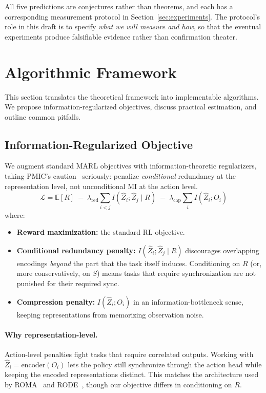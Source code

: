 \documentclass[10pt, letterpaper]{article}
\begin{document}
All five predictions are conjectures rather than theorems, and each has a corresponding measurement protocol in Section~\ref{sec:experiments}. The protocol's role in this draft is to specify \emph{what we will measure and how}, so that the eventual experiments produce falsifiable evidence rather than confirmation theater.

\section{Algorithmic Framework}
\label{sec:algorithm}

This section translates the theoretical framework into implementable algorithms. We propose information-regularized objectives, discuss practical estimation, and outline common pitfalls.

\subsection{Information-Regularized Objective}

We augment standard MARL objectives with information-theoretic regularizers, taking PMIC's caution~\cite{li2022pmic} seriously: penalize \emph{conditional} redundancy at the representation level, not unconditional MI at the action level.
\[\mathcal{L} = \mathbb{E}[R] \;-\; \lambda_{\text{red}} \sum_{i < j} I\!\left(\hat{Z}_i; \hat{Z}_j \mid R\right) \;-\; \lambda_{\text{cap}} \sum_i I\!\left(\hat{Z}_i; O_i\right)\]
where:
\begin{itemize}
    \item \textbf{Reward maximization:} the standard RL objective.
    \item \textbf{Conditional redundancy penalty:} $I(\hat{Z}_i; \hat{Z}_j \mid R)$ discourages overlapping encodings \emph{beyond} the part that the task itself induces. Conditioning on $R$ (or, more conservatively, on $S$) means tasks that require synchronization are not punished for their required sync.
    \item \textbf{Compression penalty:} $I(\hat{Z}_i; O_i)$ in an information-bottleneck sense, keeping representations from memorizing observation noise.
\end{itemize}

\paragraph{Why representation-level.} Action-level penalties fight tasks that require correlated outputs. Working with $\hat{Z}_i = \mathrm{encoder}(O_i)$ lets the policy still synchronize through the action head while keeping the encoded representations distinct. This matches the architecture used by ROMA~\cite{wang2020roma} and RODE~\cite{wang2021rode}, though our objective differs in conditioning on $R$.
\end{document}
